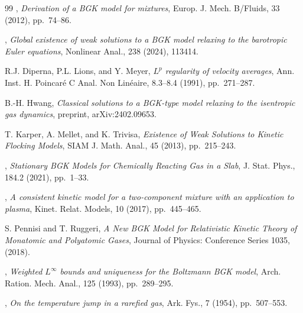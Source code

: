 \documentclass{amsart}
\theoremstyle{plain}
\theoremstyle{remark}
\numberwithin{equation}{section}
\begin{document}
\begin{thebibliography}{99}
, \emph{Derivation of a BGK model for mixtures}, Europ. J. Mech. B/Fluids, {33} (2012),
pp.~74--86.

, \emph{Global existence of weak solutions to a BGK model relaxing to the barotropic Euler equations}, 
Nonlinear Anal., {238} (2024), 113414.

{\sc R.J. Diperna, P.L. Lions, and Y. Meyer}, \emph{$L^p$ regularity of velocity averages}, Ann. Inst. H. Poincaré C Anal. Non Linéaire, {8.3--8.4} (1991), pp.~271--287.%

{\sc B.-H. Hwang}, \emph{Classical solutions to a BGK-type model relaxing to the isentropic gas dynamics}, preprint, arXiv:2402.09653.

{\sc T. Karper, A. Mellet, and K. Trivisa}, \emph{Existence of Weak Solutions to Kinetic Flocking Models}, SIAM J. Math. Anal., {45} (2013), pp.~215--243. %

, \emph{Stationary BGK Models for Chemically Reacting Gas in a Slab}, J. Stat. Phys., 184.2 (2021), pp.~1--33.%

, \emph{A consistent kinetic model for a two-component mixture with an application
to plasma}, Kinet. Relat. Models, {10} (2017), pp.~445--465.%

{\sc S. Pennisi and T. Ruggeri}, \emph{A New BGK Model for Relativistic Kinetic Theory of Monatomic and Polyatomic Gases}, Journal of Physics: Conference Series 1035, (2018). %

, \emph{Weighted $L^\infty$ bounds and uniqueness for the Boltzmann BGK model}, Arch. Ration. Mech. Anal., {125} (1993), pp.~289--295.%

, \emph{On the temperature jump in a rarefied gas}, Ark. Fys., {7} (1954), pp.~507--553.%

    
\end{thebibliography}
\end{document}
